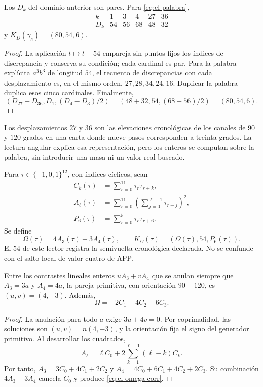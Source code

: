 \begin{lemma}
Los \(D_k\) del dominio anterior son pares. Para
\eqref{eq:el-palabra},
\[
 \begin{array}{c|rrrrr}
 k&1&3&4&27&36\\\hline
 D_k&54&56&68&48&32
 \end{array}
\]
y \(K_D(\gamma_e)=(80,54,6)\).
\end{lemma}
\begin{proof}
La aplicación \(t\mapsto t+54\) empareja sin puntos fijos los índices
de discrepancia y conserva su condición; cada cardinal es par. Para la
palabra explícita \(a^3b^3\) de longitud \(54\), el recuento de
discrepancias con cada desplazamiento es, en el mismo orden,
\(27,28,34,24,16\). Duplicar la palabra duplica esos cinco cardinales.
Finalmente,
\[
 (D_{27}+D_{36},D_1,(D_4-D_3)/2)
 =(48+32,54,(68-56)/2)=(80,54,6).
\]
\end{proof}

Los desplazamientos \(27\) y \(36\) son las elevaciones
cronológicas de los canales de \(90\) y \(120\) grados en una carta
donde nueve pasos corresponden a treinta grados. La lectura angular
explica esa representación, pero los enteros se computan sobre la
palabra, sin introducir una masa ni un valor real buscado.

\begin{definition}
Para \(\tau\in\{-1,0,1\}^{12}\), con índices cíclicos, sean
\begin{align*}
 C_k(\tau)&=\sum_{r=0}^{11}\tau_r\tau_{r+k},\\
 A_\ell(\tau)&=\sum_{r=0}^{11}
           \left(\sum_{j=0}^{\ell-1}\tau_{r+j}\right)^2,\\
 P_6(\tau)&=\sum_{r=0}^{5}\tau_r\tau_{r+6}.
\end{align*}
Se define
\begin{equation}
 \Omega(\tau)=4A_3(\tau)-3A_4(\tau),\qquad
 K_\Omega(\tau)=(\Omega(\tau),54,P_6(\tau)).
 \label{eq:el-komega}
\end{equation}
El \(54\) de este lector registra la semivuelta cronológica declarada.
No se confunde con el salto local de valor cuatro de APP.
\end{definition}

\begin{lemma}
Entre los contrastes lineales enteros \(uA_3+vA_4\) que se anulan
siempre que \(A_3=3a\) y \(A_4=4a\), la pareja primitiva, con
orientación \(90-120\), es \((u,v)=(4,-3)\). Además,
\begin{equation}
 \Omega=-2C_1-4C_2-6C_3.
 \label{eq:el-omega-corr}
\end{equation}
\end{lemma}
\begin{proof}
La anulación para todo \(a\) exige \(3u+4v=0\). Por coprimalidad,
las soluciones son \((u,v)=n(4,-3)\), y la orientación fija el signo
del generador primitivo. Al desarrollar los cuadrados,
\[
 A_\ell=\ell C_0+2\sum_{k=1}^{\ell-1}(\ell-k)C_k.
\]
Por tanto,
\(A_3=3C_0+4C_1+2C_2\) y
\(A_4=4C_0+6C_1+4C_2+2C_3\). Su combinación \(4A_3-3A_4\)
cancela \(C_0\) y produce \eqref{eq:el-omega-corr}.
\end{proof}


